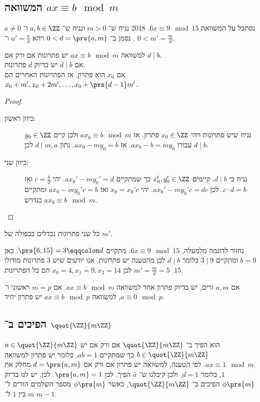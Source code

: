 \documentclass[a4paper,10pt,twoside,openany]{book}
\begin{document}
\subsection{המשוואה
$ax \equiv b \mod{m}$}
\begin{example}
נסתכל על המשוואה
$6x \equiv 9 \mod{15}$.%
{2018}
נניח ש־%
$m > 0$
ונניח ש־%
$a,b \in \ZZ$
ו־%
$a \neq 0$.
נסמן ב־%
$0 < d = \prs{a,m}$
ויהא
$a' = \frac{a}{d}$
ו־%
$0 < m' = \frac{m}{d}$.
\end{example}
\begin{proposition}
למשוואה
$ax \equiv b \mod{m}$
יש פתרונות אם ורק אם
$d \mid b$. \\
אם
$d \mid b$
יש בדיוק
$d$
פתרונות.\\
אם
$x_0$
הוא פתרון, אז הפתרונות האחרים הם
$x_0 + m', x_0 + 2m', \ldots, x_0 + \prs{d-1}m'$.
\end{proposition}
\begin{proof}
\begin{description}
\item[כיוון ראשון:]
נניח שיש פתרונות ויהי
$x_0 \in \ZZ$
פתרון.
אז
$ax_0 \equiv b \mod{m}$
ולכן קיים
$y_0 \in \ZZ$
עבורו
$ax_0 - b = my_0$.
אז
$ax_0 -my_0 = b$.
נתון
$d \mid m,a$
לכן
$d \mid b$.
\item[כיוון שני:]
נניח כי
$d \mid b$.
קיימים
$x_0',y_0' \in \ZZ$
כך שמתקיים
$ax_0' - my_0' = d$.
יהי
$c = \frac{b}{d}$
ואז
$c\cdot d = b$.
לכן
$ax_0' - my_0'c = dc$.
יהי
$x_0 = x_0'c$
ואז
$ax_0 - my_0'c = b$
ומתקיים
$ax_0 \equiv b\mod{m}$
כנדרש.
\end{description}
\end{proof}
\begin{exercise}
כל שני פתרונות נבדלים בכפולה של
$m'$.
\end{exercise}

\begin{example}
נחזור לדוגמה מלמעלה,
$6x \equiv 9 \mod{15}$.
מתקיים
$\prs{6,15} = 3 \eqqcolon d$.
כאן
$b=9$
ומתקיים
$3 \mid 9$
כלומר
$d \mid b$
לכן מהטענה יש פתרונות.
אנו יודעים שיש
$3$
פתרונות מודולו
$15$.
$m' = \frac{m}{d} = 5$
לכן
$x_0 = 4, x_1 = 9, x_2 = 14$
הם כל הפתרונות.
\end{example}

\begin{corollary}
אם
$a,m$
זרים, יש בדיוק פתרון אחד למשוואה
$ax \equiv b\mod{m}$.
אם
$m=p$
ראשוני ו־%
$a \equiv 0 \mod{p}$,
למשוואה
$ax \equiv b\mod{p}$
יש פתרון יחיד.
\end{corollary}

\subsection{הפיכים ב־%
$\quot{\ZZ}{m\ZZ}$}
$a \in \quot{\ZZ}{m\ZZ}$
הוא הפיך ב־%
$\quot{\ZZ}{m\ZZ}$
אם ורק אם יש
$b \in \quot{\ZZ}{m\ZZ}$
כך שמתקיים
$ab = 1$,
כלומר יש פתרון למשוואה
$ax \equiv 1 \mod{m}$.
לפי הטענה, למשוואה יש פתרון אם ורק אם
$d = \prs{a,m}$
מחלק את
$1$,
כלומר
$d=1$,
ולכן קיבלנו ש־%
$\bar{a}$
הפיך.
לכן
$\prs{a,m} = 1$.
לכן, יש לנו בדיוק
$\phi\prs{m}$
הפיכים ב־%
$\quot{\ZZ}{m\ZZ}$,
כאשר
$\phi\prs{m}$
מספר השלמים הזרים ל־%
$m$
בין
$1$
ל־%
$m-1$.
\end{document}

